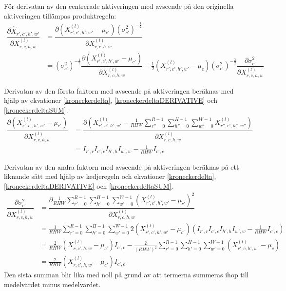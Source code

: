 \documentclass[a4paper,11pt,twoside]{article}
\newcommand*{\pd}[2]{\ensuremath{\dfrac{\partial #1}{\partial #2}}}
\begin{document}
För derivatan av den centrerade aktiveringen med avseende på den originella aktiveringen tillämpas produktregeln: \cite{webBN1} \cite{webBN2}
\begin{equation}\label{BN_kedjeregeln}
\begin{split}
\pd{\hat{X}_{r',c',h',w'}}{{X}^{(l)}_{r,c,h,w}} 
	& = \pd{(X^{(l)}_{r',c',h',w'} - \mu_{c'}){(\sigma^2_{c'})}^{-\frac{1}{2}}}{{X}^{(l)}_{r,c,h,w}} \\
	& = {(\sigma^2_{c'})}^{-\frac{1}{2}} \pd{(X^{(l)}_{r',c',h',w'} - \mu_{c'})}{{X}^{(l)}_{r,c,h,w}} - \frac{1}{2}(X^{(l)}_{r',c',h',w'} - \mu_c){(\sigma^2_{c'})}^{-\frac{3}{2}} \pd{\sigma^2_{c'}}{{X}^{(l)}_{r,c,h,w}}
\end{split}
\end{equation}

Derivatan av den första faktorn med avseende på aktiveringen beräknas med hjälp av ekvationer \eqref{kroneckerdelta}, \eqref{kroneckerdeltaDERIVATIVE} och \eqref{kroneckerdeltaSUM}. \cite{webBN1} \cite{webBN2}
\begin{equation}\label{mu'}
\begin{split}
\pd{(X^{(l)}_{r',c',h',w'} - \mu_{c'})}{{X}^{(l)}_{r,c,h,w}}
	& = \pd{({X^{(l)}_{r',c',h',w'} - \frac{1}{RHW} \sum\limits^{R-1}_{r''=0} \sum\limits^{H-1}_{h''=0} \sum\limits^{W-1}_{w''=0} X^{(l)}_{r'',c',h'',w''}})}{{X}^{(l)}_{r,c,h,w}} \\
	& = I_{r',r} I_{c',c} I_{h',h} I_{w',w} - \frac{1}{RHW} I_{c',c}
\end{split}
\end{equation}

Derivatan av den andra faktorn med avseende på aktiveringen beräknas på ett liknande sätt med hjälp av kedjeregeln och ekvationer \eqref{kroneckerdelta}, \eqref{kroneckerdeltaDERIVATIVE} och \eqref{kroneckerdeltaSUM}. \cite{webBN1} \cite{webBN2}
\begin{equation}\label{sigma'}
\begin{split}
\pd{\sigma^2_{c'}}{{X}^{(l)}_{r,c,h,w}}
	& = \pd{\frac{1}{RHW} \sum\limits^{R-1}_{r'=0} \sum\limits^{H-1}_{h'=0} \sum\limits^{W-1}_{w'=0} ({X^{(l)}_{r',c',h',w'} - \mu_{c'}})^2}{{X}^{(l)}_{r,c,h,w}} \\
	& = \frac{1}{RHW} \sum\limits^{R-1}_{r'=0} \sum\limits^{H-1}_{h'=0} \sum\limits^{W-1}_{w'=0} 2 ({X^{(l)}_{r',c',h',w'} - \mu_{c'}}) (I_{r',r} I_{c',c} I_{h',h} I_{w',w} - \frac{1}{RHW} I_{c',c}) \\
	& = \frac{2}{RHW} ({X^{(l)}_{r,c',h,w} - \mu_{c'}})I_{c',c} - \frac{2}{(RHW)^2}  \sum\limits^{R-1}_{r'=0} \sum\limits^{H-1}_{h'=0} \sum\limits^{W-1}_{w'=0} ({X^{(l)}_{r',c,h',w'} - \mu_{c}}) \\
	& = \frac{2}{RHW} ({X^{(l)}_{r,c',h,w} - \mu_{c'}})I_{c',c}
\end{split}
\end{equation}
Den sista summan blir lika med noll på grund av att termerna summeras ihop till medelvärdet minus medelvärdet. 
\end{document}
